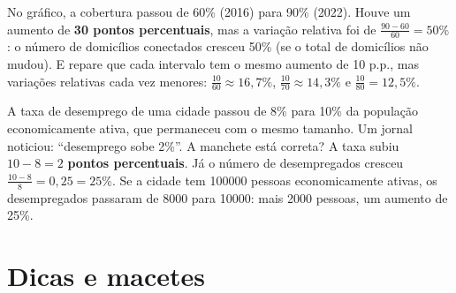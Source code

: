 \begin{center}
\end{center}

No gráfico, a cobertura passou de 60\% (2016) para 90\% (2022). Houve um
aumento de \textbf{30 pontos percentuais}, mas a variação relativa foi de
$\frac{90-60}{60} = 50\%$: o número de domicílios conectados cresceu 50\% (se o
total de domicílios não mudou). E repare que cada intervalo tem o mesmo aumento
de 10 p.p., mas variações relativas cada vez menores: $\frac{10}{60}\approx
16{,}7\%$, $\frac{10}{70}\approx 14{,}3\%$ e $\frac{10}{80}=12{,}5\%$.

\begin{exemplo}
A taxa de desemprego de uma cidade passou de 8\% para 10\% da população
economicamente ativa, que permaneceu com o mesmo tamanho. Um jornal noticiou:
``desemprego sobe 2\%''. A manchete está correta?
\solucao
A taxa subiu $10-8 = 2$ \textbf{pontos percentuais}. Já o número de
desempregados cresceu $\frac{10-8}{8} = 0{,}25 = 25\%$. Se a cidade tem
\num{100000} pessoas economicamente ativas, os desempregados passaram de
\num{8000} para \num{10000}: mais \num{2000} pessoas, um aumento de 25\%.
\end{exemplo}

\section{Dicas e macetes}

